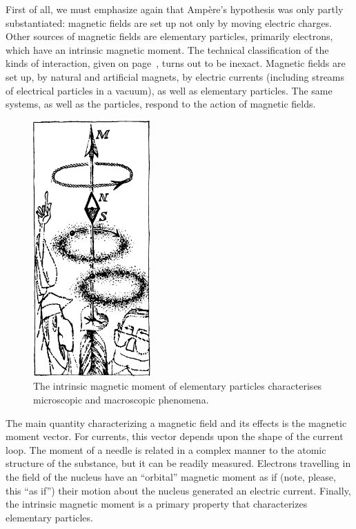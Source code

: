 First of all, we must emphasize again that Amp\`ere's hypothesis was only partly substantiated: magnetic fields are set up not only by moving electric charges. Other sources of magnetic fields are elementary particles, primarily electrons, which have an intrinsic magnetic moment. The technical classification of the kinds of interaction, given on page~\pageref{mag-interaction}, turns out to be inexact. Magnetic fields are set up, by natural and artificial magnets, by electric currents (including streams of electrical particles in a vacuum), as well as elementary particles. The same systems, as well as the particles, respond to the action of magnetic fields.

\begin{figure}[!ht]
\centering
\includegraphics[width=0.4\textwidth]{figures/fig-03-06.pdf}
\caption{The intrinsic magnetic moment of elementary particles characterises  microscopic and macroscopic phenomena.}
\label{fig-3.6}
\end{figure}

The main quantity characterizing a magnetic field and its effects is the magnetic moment vector. For currents, this vector depends upon the shape of the current loop. The moment of a needle is related in a complex manner to the atomic structure of the substance, but it can be readily measured. Electrons travelling in the field of the nucleus have an ``orbital'' magnetic moment as if (note, please, this ``as if'') their motion about the nucleus generated an electric current. Finally, the intrinsic magnetic moment is a primary property that characterizes elementary particles.

